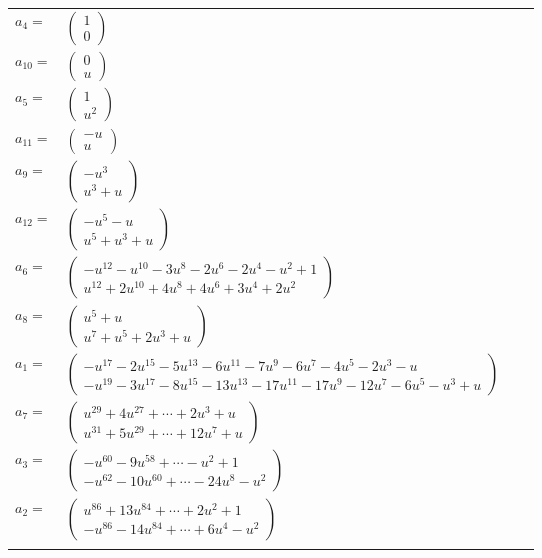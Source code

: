 \documentclass[1p]{elsarticle_modified}
\theoremstyle{definition}
\begin{document}
\begin{tabular}{m{7pt} m{180pt} m{7pt} m{180pt} }
\flushright $a_{4}=$&$\begin{pmatrix}1\\0\end{pmatrix}$ \\
\flushright $a_{10}=$&$\begin{pmatrix}0\\u\end{pmatrix}$ \\
\flushright $a_{5}=$&$\begin{pmatrix}1\\u^2\end{pmatrix}$ \\
\flushright $a_{11}=$&$\begin{pmatrix}- u\\u\end{pmatrix}$ \\
\flushright $a_{9}=$&$\begin{pmatrix}- u^3\\u^3+u\end{pmatrix}$ \\
\flushright $a_{12}=$&$\begin{pmatrix}- u^5- u\\u^5+u^3+u\end{pmatrix}$ \\
\flushright $a_{6}=$&$\begin{pmatrix}- u^{12}- u^{10}-3 u^8-2 u^6-2 u^4- u^2+1\\u^{12}+2 u^{10}+4 u^8+4 u^6+3 u^4+2 u^2\end{pmatrix}$ \\
\flushright $a_{8}=$&$\begin{pmatrix}u^5+u\\u^7+u^5+2 u^3+u\end{pmatrix}$ \\
\flushright $a_{1}=$&$\begin{pmatrix}- u^{17}-2 u^{15}-5 u^{13}-6 u^{11}-7 u^9-6 u^7-4 u^5-2 u^3- u\\- u^{19}-3 u^{17}-8 u^{15}-13 u^{13}-17 u^{11}-17 u^9-12 u^7-6 u^5- u^3+u\end{pmatrix}$ \\
\flushright $a_{7}=$&$\begin{pmatrix}u^{29}+4 u^{27}+\cdots+2 u^3+u\\u^{31}+5 u^{29}+\cdots+12 u^7+u\end{pmatrix}$ \\
\flushright $a_{3}=$&$\begin{pmatrix}- u^{60}-9 u^{58}+\cdots- u^2+1\\- u^{62}-10 u^{60}+\cdots-24 u^8- u^2\end{pmatrix}$ \\
\flushright $a_{2}=$&$\begin{pmatrix}u^{86}+13 u^{84}+\cdots+2 u^2+1\\- u^{86}-14 u^{84}+\cdots+6 u^4- u^2\end{pmatrix}$\\&\end{tabular}
\end{document}
